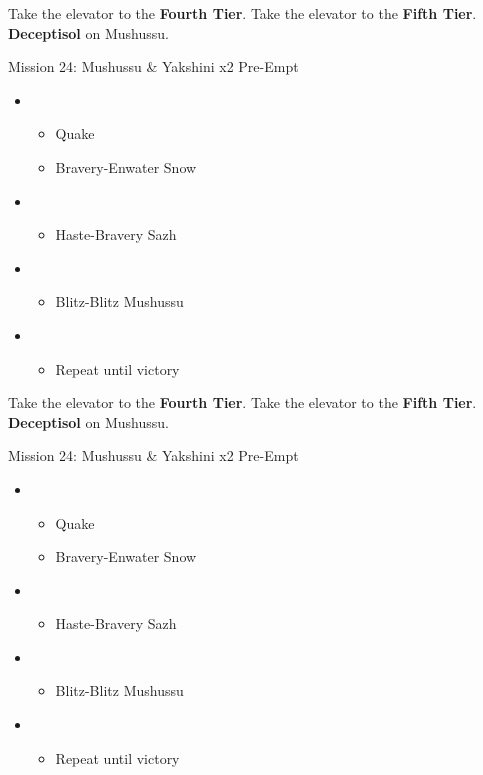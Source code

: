 \begin{paracol}{2}
	Take the elevator to the \textbf{Fourth Tier}.
	Take the elevator to the \textbf{Fifth Tier}.
	\textbf{Deceptisol} on Mushussu.

	\begin{battle}{Mission 24: Mushussu \& Yakshini x2 Pre-Empt}
		\begin{itemize}
			\item \first
			      \begin{itemize}
				      \item Quake
				      \item Bravery-Enwater Snow
			      \end{itemize}
			\item \fifth
			      \begin{itemize}
				      \item Haste-Bravery Sazh
			      \end{itemize}
			\item \fourth
			      \begin{itemize}
				      \item Blitz-Blitz Mushussu
			      \end{itemize}
			\item \sixth
			      \begin{itemize}
				      \item Repeat until victory
			      \end{itemize}
		\end{itemize}
	\end{battle}
	\switchcolumn
	Take the elevator to the \textbf{Fourth Tier}.
	Take the elevator to the \textbf{Fifth Tier}.
	\textbf{Deceptisol} on Mushussu.
	\begin{battle}{Mission 24: Mushussu \& Yakshini x2 Pre-Empt}
		\begin{itemize}
			\item \first
			      \begin{itemize}
				      \item Quake
				      \item Bravery-Enwater Snow
			      \end{itemize}
			\item \fifth
			      \begin{itemize}
				      \item Haste-Bravery Sazh
			      \end{itemize}
			\item \fourth
			      \begin{itemize}
				      \item Blitz-Blitz Mushussu
			      \end{itemize}
			\item \second
			      \begin{itemize}
				      \item Repeat until victory
			      \end{itemize}
		\end{itemize}
	\end{battle}
	\switchcolumn*


\end{paracol}
